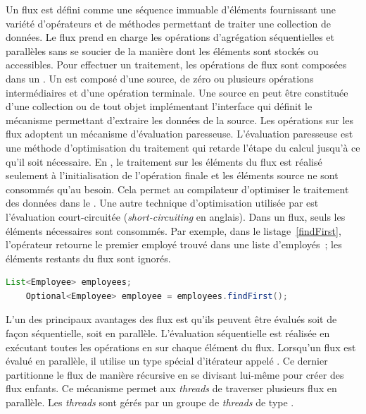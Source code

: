 Un flux est d\'efini comme une s\'equence immuable d'\'el\'ements fournissant une vari\'et\'e d'op\'erateurs et de m\'ethodes permettant de traiter une collection de donn\'ees. Le flux prend en charge les op\'erations d'agr\'egation \citep{javaStreamAggregate} s\'equentielles et parall\`eles sans se soucier de la mani\`ere dont les \'el\'ements sont stock\'es ou accessibles. Pour effectuer un traitement, les op\'erations de flux sont compos\'ees dans un . Un  est compos\'e d'une source, de z\'ero ou plusieurs op\'erations interm\'ediaires et d'une op\'eration terminale. Une source en peut \^etre constitu\'ee d'une collection ou de tout objet impl\'ementant l'interface qui d\'efinit le m\'ecanisme permettant d'extraire les donn\'ees de la source. 
Les op\'erations sur les flux adoptent un m\'ecanisme d'\'evaluation paresseuse. L'\'evaluation paresseuse est une m\'ethode d'optimisation du traitement qui retarde l'\'etape du calcul jusqu'\`a ce qu'il soit nécessaire. En , le traitement sur les \'el\'ements du flux est r\'ealis\'e seulement \`a l'initialisation de l'op\'eration finale et les \'el\'ements source ne sont consomm\'es qu'au besoin. Cela permet au compilateur d'optimiser le traitement des donn\'ees dans le .
Une autre technique d'optimisation utilis\'ee par  est l'\'evaluation court-circuit\'ee (\emph{short-circuiting} en anglais). Dans un flux, seuls les \'el\'ements n\'ecessaires sont consomm\'es. Par exemple, dans le listage~\ref{findFirst}, l'opérateur  retourne le premier employ\'e trouv\'e dans une liste d'employ\'es~; les \'el\'ements restants du flux sont ignor\'es.

\begin{Listing}[tbp]
\begin{lstlisting}[language=java]
	List<Employee> employees;
	Optional<Employee> employee = employees.findFirst();
\end{lstlisting}
\caption{Optimisation du traitement d'un flux en utilisant la technique d'\'evaluation court-circuit\'ee.}
\label{findFirst}
\end{Listing}

L'un des principaux avantages des flux est qu'ils peuvent \^etre \'evalu\'es soit de fa\c{c}on s\'equentielle, soit en parall\`ele. L'\'evaluation s\'equentielle est r\'ealis\'ee en ex\'ecutant toutes les op\'erations en  sur chaque \'el\'ement du flux. Lorsqu'un flux est \'evalu\'e en parall\`ele, il utilise un type sp\'ecial d'it\'erateur appel\'e . Ce dernier partitionne le flux de mani\`ere r\'ecursive en se divisant lui-m\^eme pour cr\'eer des flux enfants. Ce m\'ecanisme permet aux \emph{threads} de traverser plusieurs flux en parall\`ele. Les \emph{threads} sont g\'er\'es par un groupe de \emph{threads} de type .


